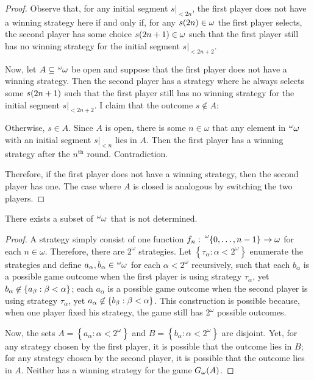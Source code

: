 \documentclass[12pt]{article}
\theoremstyle{plain}
\theoremstyle{definition}
\begin{document}
\begin{proof}
	Observe that, for any initial segment $\left.s\right|_{<2n}$, the first player does not have a winning strategy here if and only if, for any $s\mleft(2n\mright) \in \omega$ the first player selects, the second player has some choice $s\mleft(2n + 1\mright) \in \omega$ such that the first player still has no winning strategy for the initial segment $\left.s\right|_{<2n + 2}$.

	Now, let $A \subseteq \tensor*[^\omega]{\omega}{}$ be open and suppose that the first player does not have a winning strategy. Then the second player has a strategy where he always selects some $s\mleft(2n + 1\mright)$ such that the first player still has no winning strategy for the initial segment $\left.s\right|_{<2n + 2}$. I claim that the outcome $s \not\in A$:

	Otherwise, $s \in A$. Since $A$ is open, there is some $n \in \omega$ that any element in $\tensor*[^\omega]{\omega}{}$ with an initial segment $\left.s\right|_{<n}$ lies in $A$. Then the first player has a winning strategy after the $n^\text{th}$ round. Contradiction.

	Therefore, if the first player does not have a winning strategy, then the second player has one. The case where $A$ is closed is analogous by switching the two players.
\end{proof}

\begin{proposition}
	There exists a subset of $\tensor*[^\omega]{\omega}{}$ that is not determined.
\end{proposition}

\begin{proof}
	A strategy simply consist of one function $f_n : \tensor*[^\omega]{\left\{0, \ldots, n - 1\right\}}{} \rightarrow \omega$ for each $n \in \omega$. Therefore, there are $2^\omega$ strategies. Let $\left\{\tau_\alpha : \alpha < 2^\omega\right\}$ enumerate the strategies and define $a_\alpha, b_\alpha \in \tensor*[^\omega]{\omega}{}$ for each $\alpha < 2^\omega$ recursively, such that each $b_\alpha$ is a possible game outcome when the first player is using strategy $\tau_\alpha$, yet $b_\alpha \not\in \mleft\{a_\beta : \beta < \alpha\mright\}$; each $a_\alpha$ is a possible game outcome when the second player is using strategy $\tau_\alpha$, yet $a_\alpha \not\in \mleft\{b_\beta : \beta < \alpha\mright\}$. This construction is possible because, when one player fixed his strategy, the game still has $2^\omega$ possible outcomes.

	Now, the sets $A = \left\{a_\alpha : \alpha < 2^\omega\right\}$ and $B = \left\{b_\alpha : \alpha < 2^\omega\right\}$ are disjoint. Yet, for any strategy chosen by the first player, it is possible that the outcome lies in $B$; for any strategy chosen by the second player, it is possible that the outcome lies in $A$. Neither has a winning strategy for the game $G_\omega\mleft(A\mright)$.
\end{proof}
\end{document}
